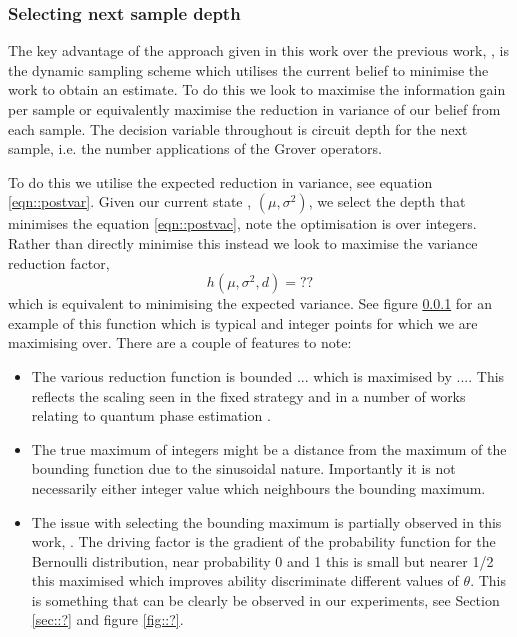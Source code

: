 \subsubsection{Selecting next sample depth}

The key advantage of the approach given in this work over the previous work, \cite{}, is the dynamic sampling scheme which utilises the current belief to minimise the work to obtain an estimate. To do this we look to maximise the information gain per sample or equivalently maximise the reduction in variance of our belief from each sample. The decision variable throughout is circuit depth for the next sample, i.e. the number applications of the Grover operators.

To do this we utilise the expected reduction in variance, see equation \ref{eqn::postvar}. Given our current state , $(\mu,\sigma^2)$, we select the depth that minimises the equation \ref{eqn::postvac}, note the optimisation is over integers. Rather than directly minimise this instead we look to maximise the variance reduction factor,
\begin{equation} h(\mu,\sigma^2,d) =?? \label{eqn::varfactor}\end{equation}
which is equivalent to minimising the expected variance. See figure \ref{} for an example of this function which is typical and integer points for which we are maximising over. There are a couple of features to note:
\begin{itemize}
	\item The various reduction function is bounded $...$ which is maximised by $...$. This reflects the scaling seen in the fixed strategy and in a number of works relating to quantum phase estimation \cite{}.
	\item The true maximum of integers might be a distance from the maximum of the bounding function due to the sinusoidal nature. Importantly it is not necessarily either integer value which neighbours the bounding maximum.
	\item The issue with selecting the bounding maximum is partially observed in this work, \cite{}. The driving factor is the gradient of the probability function for the Bernoulli distribution, near probability 0 and 1 this is small but nearer 1/2 this maximised which improves ability discriminate different values of $\theta$. This is something that can be clearly be observed in our experiments, see Section \ref{sec::?} and figure \ref{fig::?}.
\end{itemize}

